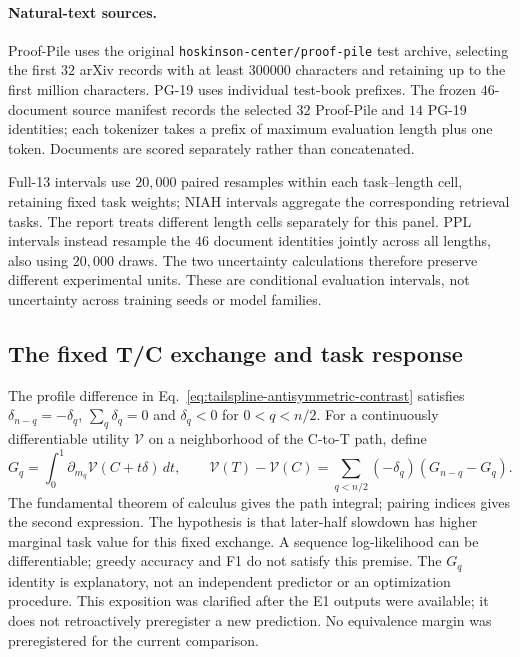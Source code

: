 \paragraph{Natural-text sources.}
Proof-Pile uses the original \texttt{hoskinson-center/proof-pile} test archive, selecting the first $32$ arXiv records with at least $300000$ characters and retaining up to the first million characters. PG-19 uses individual test-book prefixes. The frozen $46$-document source manifest records the selected $32$ Proof-Pile and $14$ PG-19 identities; each tokenizer takes a prefix of maximum evaluation length plus one token. Documents are scored separately rather than concatenated.

Full-13 intervals use $20{,}000$ paired resamples within each task--length cell, retaining fixed task weights; NIAH intervals aggregate the corresponding retrieval tasks. The report treats different length cells separately for this panel. PPL intervals instead resample the $46$ document identities jointly across all lengths, also using $20{,}000$ draws. The two uncertainty calculations therefore preserve different experimental units. These are conditional evaluation intervals, not uncertainty across training seeds or model families.

\subsection{The fixed T/C exchange and task response}
\label{sec:tc-task-connection}
The profile difference in Eq.~\eqref{eq:tailspline-antisymmetric-contrast} satisfies
$\delta_{n-q}=-\delta_q$, $\sum_q\delta_q=0$ and $\delta_q<0$ for
$0<q<n/2$. For a continuously differentiable utility $\mathcal V$ on a
neighborhood of the C-to-T path, define
\begin{equation}
G_q=\int_0^1\partial_{m_q}\mathcal V(C+t\delta)\,dt,
\qquad
\mathcal V(T)-\mathcal V(C)=\sum_{q<n/2}(-\delta_q)(G_{n-q}-G_q).
\label{eq:tc-path-utility}
\end{equation}
The fundamental theorem of calculus gives the path integral; pairing indices
gives the second expression. The hypothesis is that later-half slowdown has
higher marginal task value for this fixed exchange. A sequence log-likelihood
can be differentiable; greedy accuracy and F1 do not satisfy this premise.
The $G_q$ identity is explanatory, not an independent predictor or an
optimization procedure. This exposition was clarified after the E1 outputs
were available; it does not retroactively preregister a new prediction.
No equivalence margin was preregistered for the current comparison.

